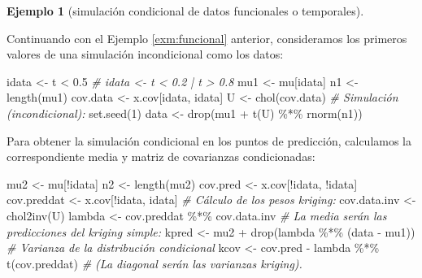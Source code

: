\documentclass[
]{book}
\newenvironment{Shaded}{\begin{snugshade}}{\end{snugshade}}
\newcommand{\CommentTok}[1]{\textcolor[rgb]{0.56,0.35,0.01}{\textit{#1}}}
\newcommand{\DecValTok}[1]{\textcolor[rgb]{0.00,0.00,0.81}{#1}}
\newcommand{\FloatTok}[1]{\textcolor[rgb]{0.00,0.00,0.81}{#1}}
\newcommand{\FunctionTok}[1]{\textcolor[rgb]{0.00,0.00,0.00}{#1}}
\newcommand{\NormalTok}[1]{#1}
\newcommand{\OtherTok}[1]{\textcolor[rgb]{0.56,0.35,0.01}{#1}}
\newcommand{\SpecialCharTok}[1]{\textcolor[rgb]{0.00,0.00,0.00}{#1}}
\theoremstyle{break}
\theoremstyle{definition}
\theoremstyle{definition}
\newtheorem{example}{Ejemplo}[chapter]
\theoremstyle{definition}
\theoremstyle{definition}
\theoremstyle{remark}
\begin{document}
\begin{example}[simulación condicional de datos funcionales o temporales]
\protect\hypertarget{exm:funcionalcond}{}{\label{exm:funcionalcond} {} }
\end{example}

Continuando con el Ejemplo \ref{exm:funcional} anterior, consideramos los primeros
valores de una simulación incondicional como los datos:

\begin{Shaded}
\begin{Highlighting}[]
\NormalTok{idata }\OtherTok{\textless{}{-}}\NormalTok{ t }\SpecialCharTok{\textless{}} \FloatTok{0.5}
\CommentTok{\# idata \textless{}{-} t \textless{} 0.2 | t \textgreater{} 0.8}
\NormalTok{mu1 }\OtherTok{\textless{}{-}}\NormalTok{ mu[idata]}
\NormalTok{n1 }\OtherTok{\textless{}{-}} \FunctionTok{length}\NormalTok{(mu1)}
\NormalTok{cov.data }\OtherTok{\textless{}{-}}\NormalTok{ x.cov[idata, idata]}
\NormalTok{U }\OtherTok{\textless{}{-}} \FunctionTok{chol}\NormalTok{(cov.data)}
\CommentTok{\# Simulación (incondicional):}
\FunctionTok{set.seed}\NormalTok{(}\DecValTok{1}\NormalTok{)}
\NormalTok{data }\OtherTok{\textless{}{-}} \FunctionTok{drop}\NormalTok{(mu1 }\SpecialCharTok{+} \FunctionTok{t}\NormalTok{(U) }\SpecialCharTok{\%*\%} \FunctionTok{rnorm}\NormalTok{(n1))}
\end{Highlighting}
\end{Shaded}

Para obtener la simulación condicional en los puntos de predicción, calculamos la correspondiente media y matriz de covarianzas condicionadas:

\begin{Shaded}
\begin{Highlighting}[]
\NormalTok{mu2 }\OtherTok{\textless{}{-}}\NormalTok{ mu[}\SpecialCharTok{!}\NormalTok{idata]}
\NormalTok{n2 }\OtherTok{\textless{}{-}} \FunctionTok{length}\NormalTok{(mu2)}
\NormalTok{cov.pred }\OtherTok{\textless{}{-}}\NormalTok{ x.cov[}\SpecialCharTok{!}\NormalTok{idata, }\SpecialCharTok{!}\NormalTok{idata]}
\NormalTok{cov.preddat }\OtherTok{\textless{}{-}}\NormalTok{ x.cov[}\SpecialCharTok{!}\NormalTok{idata, idata]}
\CommentTok{\# Cálculo de los pesos kriging:}
\NormalTok{cov.data.inv }\OtherTok{\textless{}{-}} \FunctionTok{chol2inv}\NormalTok{(U)}
\NormalTok{lambda }\OtherTok{\textless{}{-}}\NormalTok{ cov.preddat }\SpecialCharTok{\%*\%}\NormalTok{ cov.data.inv}
\CommentTok{\# La media serán las predicciones del kriging simple:}
\NormalTok{kpred }\OtherTok{\textless{}{-}}\NormalTok{ mu2 }\SpecialCharTok{+} \FunctionTok{drop}\NormalTok{(lambda }\SpecialCharTok{\%*\%}\NormalTok{ (data }\SpecialCharTok{{-}}\NormalTok{ mu1))}
\CommentTok{\# Varianza de la distribución condicional}
\NormalTok{kcov }\OtherTok{\textless{}{-}}\NormalTok{ cov.pred }\SpecialCharTok{{-}}\NormalTok{  lambda }\SpecialCharTok{\%*\%} \FunctionTok{t}\NormalTok{(cov.preddat)}
\CommentTok{\# (La diagonal serán las varianzas kriging). }
\end{Highlighting}
\end{Shaded}
\end{document}

